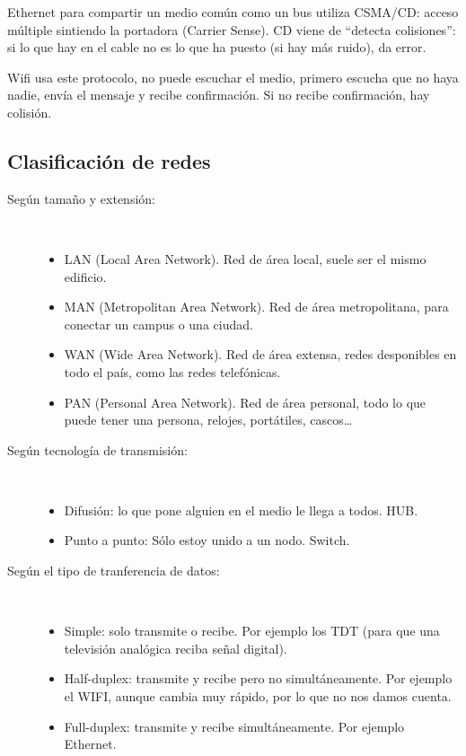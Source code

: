 \begin{definicion}[CSMA/CD]
    Ethernet para compartir un medio común como un bus utiliza CSMA/CD\@: acceso múltiple sintiendo la portadora (Carrier Sense). CD viene de ``detecta colisiones'': si lo que hay en el cable no es lo que ha puesto (si hay más ruido), da error.
\end{definicion}

\begin{definicion}[CSMA/CA]
    Wifi usa este protocolo, no puede escuchar el medio, primero escucha que no haya nadie, envía el mensaje y recibe confirmación. Si no recibe confirmación, hay colisión. 
\end{definicion}



\subsection{Clasificación de redes}
\begin{description}
    \item[Según tamaño y extensión:] \
    \begin{itemize}
        \item LAN (Local Area Network). Red de área local, suele ser el mismo edificio. 
        \item MAN (Metropolitan Area Network). Red de área metropolitana, para conectar un campus o una ciudad. 
        \item WAN (Wide Area Network). Red de área extensa, redes desponibles en todo el país, como las redes telefónicas.
        \item PAN (Personal Area Network). Red de área personal, todo lo que puede tener una persona, relojes, portátiles, cascos\ldots
    \end{itemize}
    \item[Según tecnología de transmisión:]\
    \begin{itemize}
        \item Difusión: lo que pone alguien en el medio le llega a todos. HUB\@.
        \item Punto a punto: Sólo estoy unido a un nodo. Switch.
    \end{itemize}
    \item[Según el tipo de tranferencia de datos:] \
    \begin{itemize}
        \item Simple: solo transmite o recibe. Por ejemplo los TDT (para que una televisión analógica reciba señal digital).
        \item Half-duplex: transmite y recibe pero no simultáneamente. Por ejemplo el WIFI, aunque cambia muy rápido, por lo que no nos damos cuenta.
        \item Full-duplex: transmite y recibe simultáneamente. Por ejemplo Ethernet. 
    \end{itemize}
\end{description}

